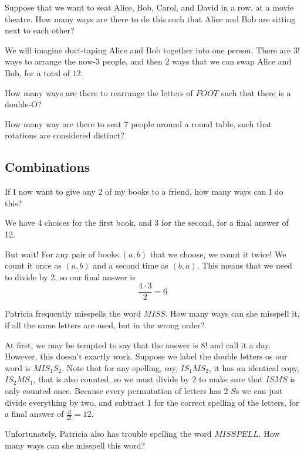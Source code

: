 \documentclass{scrartcl}
\begin{document}
	\begin{example}
		Suppose that we want to seat Alice, Bob, Carol, and David in a row, at a movie theatre. How many ways are there to do this such that Alice and Bob are sitting next to each other?
	\end{example}
	\begin{soln}
		We will imagine duct-taping Alice and Bob together into one person. There are $3!$ ways to arrange the now-3 people, and then $2$ ways that we can swap Alice and Bob, for a total of $\boxed{12}$.
	\end{soln}
	\begin{exercise}
		How many ways are there to rearrange the letters of $FOOT$ such that there is a double-O?
	\end{exercise}
	\begin{exercise}
		How many way are there to seat 7 people around a round table, such that rotations are considered distinct?
	\end{exercise}
	
	\subsection{Combinations}
	\begin{example}
		If I now want to give any 2 of my books to a friend, how many ways can I do this?
	\end{example}
	\begin{soln}
		We have 4 choices for the first book, and 3 for the second, for a final answer of 12.

		But wait! For any pair of books $(a,b)$ that we choose, we count it twice! We count it once as $(a,b)$ and a second time as $(b,a)$. This means that we need to divide by 2, so our final answer is 
		\[\frac{4 \cdot 3}{2} = \boxed{6}\]
	\end{soln}

	\begin{example} 
		Patricia frequently misspells the word $MISS$. How many ways can she misspell it, if all the same letters are used, but in the wrong order?
	\end{example}
	\begin{soln}
		At first, we may be tempted to say that the answer is $8!$ and call it a day. However, this doesn't exactly work. Suppose we label the double letters os our word is $MIS_1S_2$. Note that for any spelling, say, $IS_1MS_2$, it has an identical copy, $IS_2MS_1$, that is also counted, so we must divide by 2 to make sure that $ISMS$ is only counted once. Because every permutation of letters has 2 $S$s we can just divide everything by two, and subtract 1 for the correct spelling of the letters, for a final answer of $\frac{4!}{2!} = 12$.
	\end{soln}
	\begin{exercise}
		Unfortunately, Patricia also has trouble spelling the word $MISSPELL$. How many ways can she misspell this word?
	\end{exercise}
\end{document}
